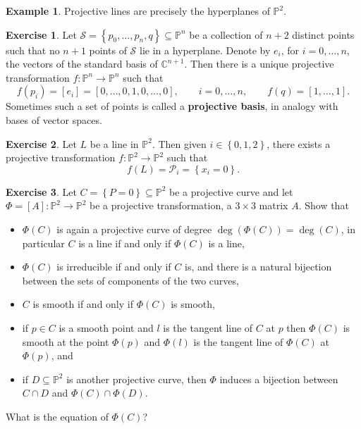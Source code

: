 \documentclass{article}
\newcommand{\C}{\mathbb{C}}
\renewcommand{\P}{\mathbb{P}}
\renewcommand{\S}{\mathcal{S}}
\newcommand{\rb}[1]{\left( #1 \right)}
\renewcommand{\sb}[1]{\left[ #1 \right]}
\newcommand{\cb}[1]{\left\{ #1 \right\}}
\theoremstyle{definition}\newtheorem{definition}{Definition}[section]
\theoremstyle{definition}\newtheorem{notation}[definition]{Notation}
\theoremstyle{definition}\newtheorem{remark}[definition]{Remark}
\theoremstyle{definition}\newtheorem{example1}[definition]{Example}
\theoremstyle{definition}\newtheorem{fact}{Fact}
\theoremstyle{definition}\newtheorem{exercise}{Exercise}
\theoremstyle{definition}\newtheorem*{example2}{Example}
\begin{document}
\begin{example1}
Projective lines are precisely the hyperplanes of $ \P^2 $.
\end{example1}

\begin{exercise}
Let $ \S = \cb{p_0, \dots, p_n, q} \subseteq \P^n $ be a collection of $ n + 2 $ distinct points such that no $ n + 1 $ points of $ \S $ lie in a hyperplane. Denote by $ e_i $, for $ i = 0, \dots, n $, the vectors of the standard basis of $ \C^{n + 1} $. Then there is a unique projective transformation $ f : \P^n \to \P^n $ such that
$$ f\rb{p_i} = \sb{e_i} = \sb{0, \dots, 0, 1, 0, \dots, 0}, \qquad i = 0, \dots, n, \qquad f\rb{q} = \sb{1, \dots, 1}. $$
Sometimes such a set of points is called a \textbf{projective basis}, in analogy with bases of vector spaces.
\end{exercise}

\begin{exercise}
Let $ L $ be a line in $ \P^2 $. Then given $ i \in \cb{0, 1, 2} $, there exists a projective transformation $ f : \P^2 \to \P^2 $ such that
$$ f\rb{L} = \mathcal{P}_i = \cb{x_i = 0}. $$
\end{exercise}

\begin{exercise}
\label{ex:29}
Let $ C = \cb{P = 0} \subseteq \P^2 $ be a projective curve and let $ \Phi = \sb{A} : \P^2 \to \P^2 $ be a projective transformation, a $ 3 \times 3 $ matrix $ A $. Show that
\begin{itemize}
\item $ \Phi\rb{C} $ is again a projective curve of degree $ \deg\rb{\Phi\rb{C}} = \deg\rb{C} $, in particular $ C $ is a line if and only if $ \Phi\rb{C} $ is a line,
\item $ \Phi\rb{C} $ is irreducible if and only if $ C $ is, and there is a natural bijection between the sets of components of the two curves,
\item $ C $ is smooth if and only if $ \Phi\rb{C} $ is smooth,
\item if $ p \in C $ is a smooth point and $ l $ is the tangent line of $ C $ at $ p $ then $ \Phi\rb{C} $ is smooth at the point $ \Phi\rb{p} $ and $ \Phi\rb{l} $ is the tangent line of $ \Phi\rb{C} $ at $ \Phi\rb{p} $, and
\item if $ D \subseteq \P^2 $ is another projective curve, then $ \Phi $ induces a bijection between $ C \cap D $ and $ \Phi\rb{C} \cap \Phi\rb{D} $.
\end{itemize}
What is the equation of $ \Phi\rb{C} $?
\end{exercise}
\end{document}
